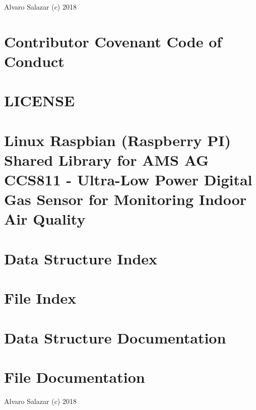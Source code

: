 Alvaro Salazar (c) 2018\chapter{Contributor Covenant Code of Conduct}
\label{md__c_o_d_e__o_f__c_o_n_d_u_c_t}

\chapter{L\+I\+C\+E\+N\+SE}
\label{md__l_i_c_e_n_s_e}

\chapter{Linux Raspbian (Raspberry PI) Shared Library for A\+MS AG C\+C\+S811 -\/ Ultra-\/\+Low Power Digital Gas Sensor for Monitoring Indoor Air Quality}
\label{md__r_e_a_d_m_e}

\chapter{Data Structure Index}

\chapter{File Index}

\chapter{Data Structure Documentation}

\chapter{File Documentation}





Alvaro Salazar (c) 2018